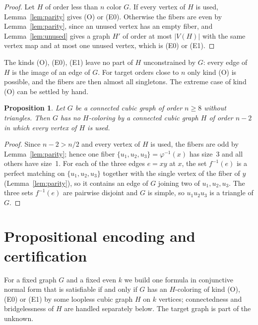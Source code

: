 \documentclass[11pt]{article}
\newtheorem{proposition}[theorem]{Proposition}
\theoremstyle{definition}
\theoremstyle{remark}
\begin{document}
\begin{proof}
Let $H$ of order less than $n$ color $G$. If every vertex of $H$ is used, Lemma~\ref{lem:parity}
gives (O) or (E0). Otherwise the fibers are even by Lemma~\ref{lem:parity}, since an unused vertex
has an empty fiber, and Lemma~\ref{lem:unused} gives a graph $H'$ of order at most $|V(H)|$ with
the same vertex map and at most one unused vertex, which is (E0) or (E1).
\end{proof}

The kinds (O), (E0), (E1) leave no part of $H$ unconstrained by $G$: every edge of $H$ is the image
of an edge of $G$. For target orders close to $n$ only kind (O) is possible, and the fibers are then
almost all singletons. The extreme case of kind (O) can be settled by hand.

\begin{proposition}\label{prop:nminus2}
Let $G$ be a connected cubic graph of order $n \ge 8$ without triangles. Then $G$ has no
$H$-coloring by a connected cubic graph $H$ of order $n - 2$ in which every vertex of $H$ is used.
\end{proposition}

\begin{proof}
Since $n - 2 > n/2$ and every vertex of $H$ is used, the fibers are odd by
Lemma~\ref{lem:parity}; hence one fiber $\{u_1, u_2, u_3\} = \varphi^{-1}(x)$ has size~3 and all
others have size~1. For each of the three edges $e = xy$ at $x$, the set $f^{-1}(e)$ is a perfect matching on
$\{u_1, u_2, u_3\}$ together with the single vertex of the fiber of $y$
(Lemma~\ref{lem:parity}), so it contains an edge of $G$ joining two of $u_1, u_2, u_3$. The three
sets $f^{-1}(e)$ are pairwise disjoint and $G$ is simple, so $u_1u_2u_3$ is a triangle of $G$.
\end{proof}

\section{Propositional encoding and certification}\label{sec:encoding}

For a fixed graph $G$ and a fixed even $k$ we build one formula in conjunctive normal form that is
satisfiable if and only if $G$ has an $H$-coloring of kind (O), (E0) or (E1) by some loopless
cubic graph $H$ on $k$ vertices; connectedness and bridgelessness of $H$ are handled separately
below. The target graph is part of the unknown.
\end{document}
